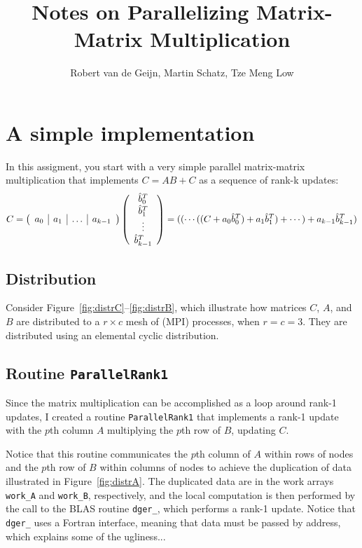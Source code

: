 \documentclass[10pt]{article}
\title{Notes on Parallelizing Matrix-Matrix Multiplication}
\author{Robert van de Geijn, Martin Schatz, Tze Meng Low}
\begin{document}
\maketitle

\section{A simple implementation}

In this assigment, you start with a very simple parallel matrix-matrix 
multiplication that implements $ C = A B + C $ as a sequence of rank-k updates:
\[
C = \left( 
\begin{array}{c | c | c | c}
a_0 & a_1 & \ldots & a_{k-1}
\end{array}
\right) 
\left(
\begin{array}{c}
\hat{b}^T_0 \\
\hat{b}^T_1 \\
\vdots \\
\hat{b}^T_{k-1}
\end{array}
\right) 
=
(  (\cdots  ( ( C + a_0 \hat{b}^T_0  ) + a_1 \hat{b}^T_1 )  + \cdots ) + a_{k-1} \hat{b}^T_{k-1} )
\]

\subsection{Distribution}

Consider Figure~\ref{fig:distrC}--\ref{fig:distrB}, 
which illustrate how matrices $ C $, $ A $, and $ B $ are distributed to a $ r \times c $ mesh of (MPI) processes, when $ r = c = 3 $.
They are distributed using an elemental cyclic distribution.
            


\subsection{Routine {\tt ParallelRank1}}

Since the matrix multiplication can be accomplished as a loop around
rank-1 updates, I created a routine {\tt ParallelRank1} that
implements a rank-1 update with the $ p$th column $ A $ multiplying
the $ p $th row of $ B$, updating $ C $.

Notice that this routine communicates the $ p $th column of $ A $ within
rows of nodes and the $ p $th row of $ B $ within columns of nodes to
achieve the duplication of data illustrated in
Figure~\ref{fig:distrA}.  The duplicated data are in the work arrays {\tt
work\_A} and {\tt work\_B}, respectively, and the local computation is
then performed by the call to the BLAS routine {\tt dger\_}, which
performs a rank-1 update.  Notice that {\tt dger\_} uses a Fortran
interface, meaning that data must be passed by address, which explains
some of the ugliness...
\end{document}
